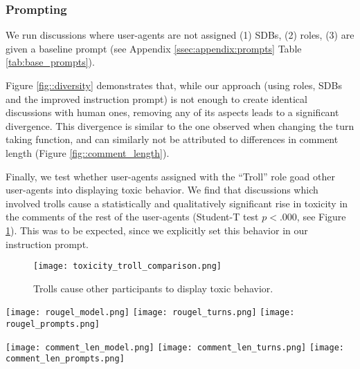 \subsubsection{Prompting}

We run discussions where user-agents are not assigned (1) \acp{SDB}, (2) roles, (3) are given a baseline prompt (see Appendix \ref{ssec:appendix:prompts} Table \ref{tab:base_prompts}).

Figure \ref{fig::diversity} demonstrates that, while our approach (using roles, \acp{SDB} and the improved instruction prompt) is not enough to create identical discussions with human ones, removing any of its aspects leads to a significant divergence. This divergence is similar to the one observed when changing the turn taking function, and can similarly not be attributed to differences in comment length (Figure \ref{fig::comment_length}).

Finally, we test whether user-agents assigned with the “Troll” role goad other user-agents into displaying toxic behavior. We find that discussions which involved trolls cause a statistically and qualitatively significant rise in toxicity in the comments of the rest of the user-agents (Student-T test $p<.000$, see Figure \ref{fig::goad}). This was to be expected, since we explicitly set this behavior in our instruction prompt.

\begin{figure}
    \texttt{[image: toxicity\_troll\_comparison.png]} 
	\caption{Trolls cause other participants to display toxic behavior.}
	\label{fig::goad}
\end{figure}

\begin{figure*}[t]
    \texttt{[image: rougel\_model.png]} \hfill
    \texttt{[image: rougel\_turns.png]}
    \hfill
    \texttt{[image: rougel\_prompts.png]}
	\centering
	\caption{Diversity (Section \ref{ssec:methodology:diversity}) distribution for each discussion by model (Section \ref{ssec:experimental:model}), turn-taking function $u$ (Section \ref{ssec:experimental:turn}), and prompting function $\phi$ used (Section \ref{ssec:experimental:prompts}).}
	\label{fig::diversity}
\end{figure*}

\begin{figure*}[t]
    \texttt{[image: comment\_len\_model.png]} \hfill
    \texttt{[image: comment\_len\_turns.png]}
    \hfill
    \texttt{[image: comment\_len\_prompts.png]}
	\centering
	\caption{Comment length for each discussion by model (Section \ref{ssec:experimental:model}), turn-taking function $u$ (Section \ref{ssec:experimental:turn}), and prompting function $\phi$ used (Section \ref{ssec:experimental:prompts}). For ease of comparison, comments above $400$ words are marked at the end of the x-axis.}
	\label{fig::comment_length}
\end{figure*}



